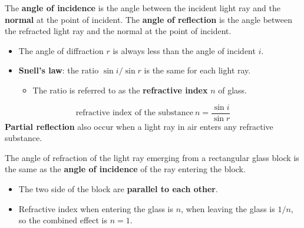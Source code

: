 The \textbf{angle of incidence} is the angle between the incident light ray and the \textbf{normal} at the point of incident. The \textbf{angle of reflection} is the angle between the refracted light ray and the normal at the point of incident.
\begin{itemize}
    \item The angle of diffraction $r$ is always less than the angle of incident $i$.
    \item \textbf{Snell's law}: the ratio $\sin i/\sin r$ is the same for each light ray.
        \begin{itemize}
            \item The ratio is referred to as the \textbf{refractive index} $n$ of glass.
        \end{itemize}
\end{itemize}
$$\text{refractive index of the substance}\ n=\frac{\sin i}{\sin r}$$
\textbf{Partial reflection} also occur when a light ray in air enters any refractive substance.

The angle of refraction of the light ray emerging from a rectangular glass block is the same as the \textbf{angle of incidence} of the ray entering the block.
\begin{itemize}
    \item The two side of the block are \textbf{parallel to each other}.
    \item Refractive index when entering the glass is $n$, when leaving the glass is $1/n$, so the combined effect is $n=1$.
\end{itemize}
